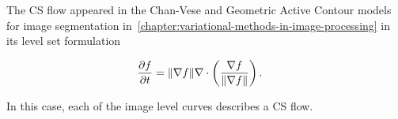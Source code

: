 The CS flow appeared in the Chan-Vese and Geometric Active Contour models for image segmentation in~\cref{chapter:variational-methods-in-image-processing} in its level set formulation~\cite{osher88fronts}

\begin{align}
	\frac{\partial f}{\partial t} &= \lVert\nabla f\rVert\nabla \cdot \left( \frac{\nabla f}{\lVert\nabla f\rVert} \right).
	\label{ch4:eq:implicit-curvature-flow}
\end{align}

In this case, each of the image level curves describes a CS flow.

\begin{figure}
\center
{}\hspace{1em}
\hspace{1em}

\end{figure}
